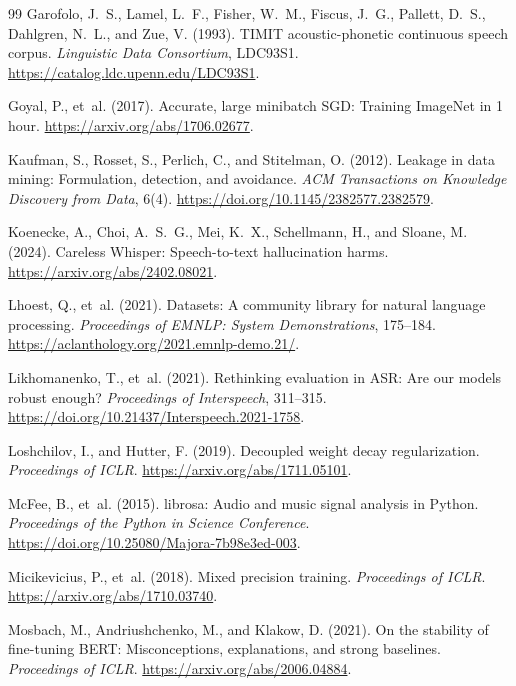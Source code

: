 \begin{thebibliography}{99}
Garofolo, J.~S., Lamel, L.~F., Fisher, W.~M., Fiscus, J.~G., Pallett, D.~S.,
Dahlgren, N.~L., and Zue, V. (1993). TIMIT acoustic-phonetic continuous speech
corpus. \emph{Linguistic Data Consortium}, LDC93S1.
\url{https://catalog.ldc.upenn.edu/LDC93S1}.

Goyal, P., et~al. (2017). Accurate, large minibatch SGD: Training ImageNet
in 1 hour. \url{https://arxiv.org/abs/1706.02677}.

Kaufman, S., Rosset, S., Perlich, C., and Stitelman, O. (2012).
Leakage in data mining: Formulation, detection, and avoidance.
\emph{ACM Transactions on Knowledge Discovery from Data}, 6(4).
\url{https://doi.org/10.1145/2382577.2382579}.

Koenecke, A., Choi, A.~S.~G., Mei, K.~X., Schellmann, H., and Sloane, M.
(2024). Careless Whisper: Speech-to-text hallucination harms.
\url{https://arxiv.org/abs/2402.08021}.

Lhoest, Q., et~al. (2021). Datasets: A community library for natural language
processing. \emph{Proceedings of EMNLP: System Demonstrations}, 175--184.
\url{https://aclanthology.org/2021.emnlp-demo.21/}.

Likhomanenko, T., et~al. (2021).
Rethinking evaluation in ASR: Are our models robust enough?
\emph{Proceedings of Interspeech}, 311--315.
\url{https://doi.org/10.21437/Interspeech.2021-1758}.

Loshchilov, I., and Hutter, F. (2019). Decoupled weight decay regularization.
\emph{Proceedings of ICLR}. \url{https://arxiv.org/abs/1711.05101}.

McFee, B., et~al. (2015). librosa: Audio and music signal analysis in Python.
\emph{Proceedings of the Python in Science Conference}.
\url{https://doi.org/10.25080/Majora-7b98e3ed-003}.

Micikevicius, P., et~al. (2018). Mixed precision training.
\emph{Proceedings of ICLR}. \url{https://arxiv.org/abs/1710.03740}.

Mosbach, M., Andriushchenko, M., and Klakow, D. (2021).
On the stability of fine-tuning BERT: Misconceptions, explanations, and strong
baselines. \emph{Proceedings of ICLR}.
\url{https://arxiv.org/abs/2006.04884}.


\end{thebibliography}
